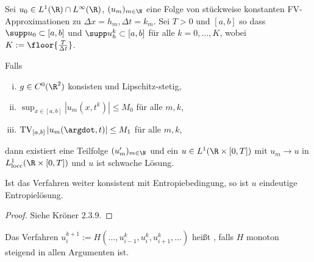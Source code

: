 \begin{st} \label{5.14}
    Sei $u_0 \in L^1(\R) \cap L^\infty(\R)$, $(u_m)_{m\in \N}$ eine Folge von stückweise konstanten FV-Approximationen zu $\Delta x = h_m, \Delta t = k_m$.
    Sei $T > 0$ und $[a,b]$ so dass $\supp u_0 \subset [a,b]$ und $\supp u_h^k \subset [a,b]$ für alle $k = 0, \dotsc, K$, wobei $K := \floor{\frac{T}{\Delta t}}$.

    Falls
    \begin{enumerate}[i)]
        \item
            $g \in C^0(\R^2)$ konsisten und Lipschitz-stetig,
        \item
            $\sup_{x\in [a,b]} |u_m(x,t^k)| \le M_0$ für alle $m, k$,
        \item
            $\TV_{[a,b]} |u_m(\argdot, t)| \le M_1$ für alle $m, k$,
    \end{enumerate}
    dann existiert eine Teilfolge $(u_m')_{m\in\N}$ und ein $u \in L^1(\R \times [0,T])$ mit $u_m \to u$ in $L^1_{\text{locc}}(\R \times [0,T])$ und $u$ ist schwache Lösung.

    Ist das Verfahren weiter konsistent mit Entropiebedingung, so ist $u$ eindeutige Entropielösung.
    \begin{proof}
        Siehe Kröner 2.3.9.
    \end{proof}
\end{st}


\begin{df} \label{5.15}
    Das Verfahren
    \begin{math}
        u_i^{k+1}
        := H(\dotsc, u_{i-1}^k, u_i^k, u_{i+1}^k, \dotsc)
    \end{math}
    heißt , falls $H$ monoton steigend in allen Argumenten ist.
\end{df}

